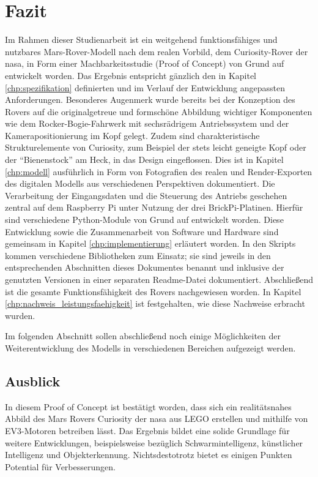 \chapter{Fazit}
\label{chp:fazit}

Im Rahmen dieser Studienarbeit ist ein weitgehend funktionsfähiges und nutzbares Mars-Rover-Modell nach dem realen Vorbild, dem Curiosity-Rover der \acs{nasa}, in Form einer Machbarkeitsstudie (Proof of Concept) von Grund auf entwickelt worden.
Das Ergebnis entspricht gänzlich den in Kapitel \ref{chp:spezifikation} definierten und im Verlauf der Entwicklung angepassten Anforderungen.
Besonderes Augenmerk wurde bereits bei der Konzeption des Rovers auf die originalgetreue und formschöne Abbildung wichtiger Komponenten wie dem Rocker-Bogie-Fahrwerk mit sechsrädrigem Antriebssystem und der Kamerapositionierung im Kopf gelegt.
Zudem sind charakteristische Strukturelemente von Curiosity, zum Beispiel der stets leicht geneigte Kopf oder der \enquote{Bienenstock} am Heck, in das Design eingeflossen.
Dies ist in Kapitel \ref{chp:modell} ausführlich in Form von Fotografien des realen und Render-Exporten des digitalen Modells aus verschiedenen Perspektiven dokumentiert.
Die Verarbeitung der Eingangsdaten und die Steuerung des Antriebs geschehen zentral auf dem Raspberry Pi unter Nutzung der drei BrickPi-Platinen.
Hierfür sind verschiedene Python-Module von Grund auf entwickelt worden.
Diese Entwicklung sowie die Zusammenarbeit von Software und Hardware sind gemeinsam in Kapitel \ref{chp:implementierung} erläutert worden.
In den Skripts kommen verschiedene Bibliotheken zum Einsatz; sie sind jeweils in den entsprechenden Abschnitten dieses Dokumentes benannt und inklusive der genutzten Versionen in einer separaten Readme-Datei dokumentiert.
Abschließend ist die gesamte Funktionsfähigkeit des Rovers nachgewiesen worden.
In Kapitel \ref{chp:nachweis_leistungsfaehigkeit} ist festgehalten, wie diese Nachweise erbracht wurden.

Im folgenden Abschnitt sollen abschließend noch einige Möglichkeiten der Weiterentwicklung des Modells in verschiedenen Bereichen aufgezeigt werden.

\section{Ausblick}
\label{sec:ausblick}

In diesem Proof of Concept ist bestätigt worden, dass sich ein realitätsnahes Abbild des Mars Rovers Curiosity der \acs{nasa} aus LEGO erstellen und mithilfe von EV3-Motoren betreiben lässt.
Das Ergebnis bildet eine solide Grundlage für weitere Entwicklungen, beispielsweise bezüglich Schwarmintelligenz, künstlicher Intelligenz und Objekterkennung.
Nichtsdestotrotz bietet es einigen Punkten Potential für Verbesserungen.

